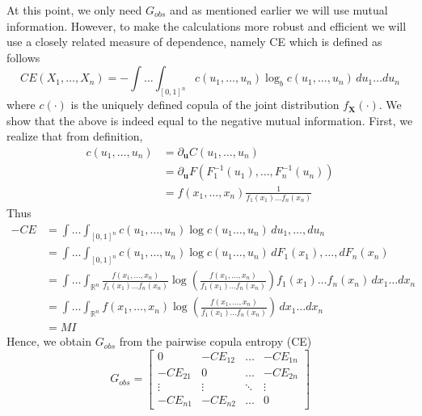 \documentclass[../Thesis.tex]{subfiles}
\begin{document}
At this point, we only need $G_{obs}$ and as mentioned earlier we will use mutual information. However, to make the calculations more robust and efficient we will use a closely related measure of dependence, namely CE which is defined as follows
$$ CE\left(X_1,\dots, X_n\right) = -\int \dots \int_{[0,1]^n} c\left(u_1,\dots, u_n\right) \log_{b}c\left(u_1,\dots, u_n\right) \, d u_1 \dots d u_n$$
where $c(\cdot)$ is the uniquely defined copula of the joint distribution $f_{\mathbf{X}}(\cdot)$. We show that the above is indeed equal to the negative mutual information. First, we realize that from definition,
\begin{align*}
    c(u_1,\dots , u_n) & = \partial_{\mathbf{u}} C(u_1,\dots,u_n)                                                        \\
                       & = \partial_{\mathbf{u}} F\left(F_1^{-1}\left(u_1\right), \dots, F_n^{-1}\left(u_n\right)\right) \\
                       & = f\left(x_1,\dots, x_n\right) \frac{1}{f_1(x_1)\dots f_n(x_n)}
\end{align*}
Thus
\begin{align*}
    -CE & = \int\dots \int_{[0,1]^n} c\left(u_1,\dots, u_n\right) \log c\left(u_1\dots,u_n\right) \, d u_1, \dots, d u_n                                                                               \\
        & =\int\dots \int_{[0,1]^n} c\left(u_1,\dots, u_n\right) \log c\left(u_1\dots,u_n\right) \, d F_1(x_1), \dots, d F_n(x_n)                                                                      \\
        & = \int \dots \int_{\mathbb{R}^n} \frac{f(x_1,\dots, x_n)}{f_1(x_1)\dots f_n(x_n)} \log\left(\frac{f(x_1,\dots, x_n)}{f_1(x_1)\dots f_n(x_n)}\right) f_1(x_1)\dots f_n(x_n) \, dx_1\dots dx_n \\
        & = \int \dots \int_{\mathbb{R}^n} f(x_1,\dots, x_n) \log\left(\frac{f(x_1,\dots, x_n)}{f_1(x_1)\dots f_n(x_n)}\right)  \, dx_1\dots dx_n                                                      \\
        & = MI
\end{align*}
Hence, we obtain $G_{obs}$ from the pairwise copula entropy (CE)
$$G_{obs} = \begin{bmatrix}
        0        & - CE_{12} & \dots  & - CE_{1n} \\
        -CE_{21} & 0         & \dots  & - CE_{2n} \\
        \vdots   & \vdots    & \ddots & \vdots    \\
        -CE_{n1} & -CE_{n2}  & \dots  & 0
    \end{bmatrix}$$
\end{document}
